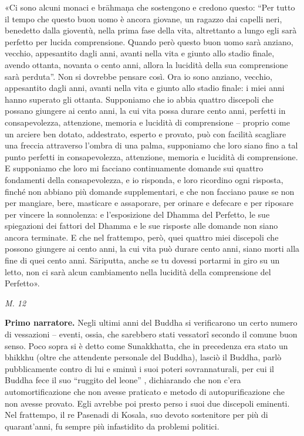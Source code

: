 «Ci sono alcuni monaci e brāhmaṇa che sostengono e credono questo: “Per
tutto il tempo che questo buon uomo è ancora giovane, un ragazzo dai
capelli neri, benedetto dalla gioventù, nella prima fase della vita,
altrettanto a lungo egli sarà perfetto per lucida comprensione. Quando
però questo buon uomo sarà anziano, vecchio, appesantito dagli anni,
avanti nella vita e giunto allo stadio finale, avendo ottanta, novanta o
cento anni, allora la lucidità della sua comprensione sarà perduta”. Non
si dovrebbe pensare così. Ora io sono anziano, vecchio, appesantito
dagli anni, avanti nella vita e giunto allo stadio finale: i miei anni
hanno superato gli ottanta. Supponiamo che io abbia quattro discepoli
che possano giungere ai cento anni, la cui vita possa durare cento anni,
perfetti in consapevolezza, attenzione, memoria e lucidità di
comprensione – proprio come un arciere ben dotato, addestrato, esperto e
provato, può con facilità scagliare una freccia attraverso l’ombra di
una palma, supponiamo che loro siano fino a tal punto perfetti in
consapevolezza, attenzione, memoria e lucidità di comprensione. E
supponiamo che loro mi facciano continuamente domande sui quattro
fondamenti della consapevolezza, e io risponda, e loro ricordino ogni
risposta, finché non abbiano più domande supplementari, e che non
facciano pause se non per mangiare, bere, masticare e assaporare, per
orinare e defecare e per riposare per vincere la sonnolenza: e
l’esposizione del Dhamma del Perfetto, le sue spiegazioni dei fattori
del Dhamma e le sue risposte alle domande non siano ancora terminate. E
che nel frattempo, però, quei quattro miei discepoli che possono
giungere ai cento anni, la cui vita può durare cento anni, siano morti
alla fine di quei cento anni. Sāriputta, anche se tu dovessi portarmi in
giro su un letto, non ci sarà alcun cambiamento nella lucidità della
comprensione del Perfetto».


\emph{M. 12}


\textbf{Primo narratore.} Negli ultimi anni del Buddha si verificarono un certo
numero di vessazioni – eventi, ossia, che sarebbero stati vessatorî
secondo il comune buon senso. Poco sopra si è detto come Sunakkhatta,
che in precedenza era stato un bhikkhu (oltre che attendente personale
del Buddha), lasciò il Buddha, parlò pubblicamente contro di lui e
sminuì i suoi poteri sovrannaturali, per cui il Buddha fece il suo
“ruggito del leone” , dichiarando che non c’era automortificazione che
non avesse praticato e metodo di autopurificazione che non avesse
provato. Egli avrebbe poi presto perso i suoi due discepoli eminenti.
Nel frattempo, il re Pasenadi di Kosala, suo devoto sostenitore per più
di quarant’anni, fu sempre più infastidito da problemi politici.


